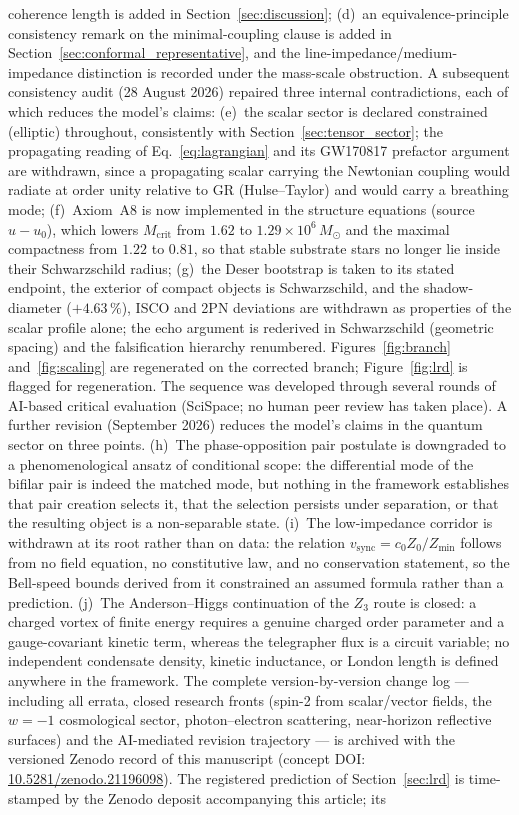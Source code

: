 \documentclass[11pt,a4paper]{article}
\theoremstyle{plain}
\theoremstyle{remark}
\begin{document}
coherence length is added in Section~\ref{sec:discussion}; (d)~an equivalence-principle consistency remark on the minimal-coupling clause is added in Section~\ref{sec:conformal_representative}, and the line-impedance/medium-impedance distinction is recorded under the mass-scale obstruction. A subsequent consistency audit (28 August 2026) repaired three internal contradictions, each of which reduces the model's claims: (e)~the scalar sector is declared constrained (elliptic) throughout, consistently with Section~\ref{sec:tensor_sector}; the propagating reading of Eq.~\eqref{eq:lagrangian} and its GW170817 prefactor argument are withdrawn, since a propagating scalar carrying the Newtonian coupling would radiate at order unity relative to GR (Hulse--Taylor) and would carry a breathing mode; (f)~Axiom~A8 is now implemented in the structure equations (source $u - u_0$), which lowers $M_{\text{crit}}$ from $1.62$ to $1.29\times10^{6}\,M_\odot$ and the maximal compactness from $1.22$ to $0.81$, so that stable substrate stars no longer lie inside their Schwarzschild radius; (g)~the Deser bootstrap is taken to its stated endpoint, the exterior of compact objects is Schwarzschild, and the shadow-diameter ($+4.63\,\%$), ISCO and 2PN deviations are withdrawn as properties of the scalar profile alone; the echo argument is rederived in Schwarzschild (geometric spacing) and the falsification hierarchy renumbered. Figures~\ref{fig:branch} and~\ref{fig:scaling} are regenerated on the corrected branch; Figure~\ref{fig:lrd} is flagged for regeneration. The sequence was developed through several rounds of AI-based critical evaluation (SciSpace; no human peer review has taken place). A further revision (September 2026) reduces the model's claims in the quantum sector on three points. (h)~The phase-opposition pair postulate is downgraded to a phenomenological ansatz of conditional scope: the differential mode of the bifilar pair is indeed the matched mode, but nothing in the framework establishes that pair creation selects it, that the selection persists under separation, or that the resulting object is a non-separable state. (i)~The low-impedance corridor is withdrawn at its root rather than on data: the relation $v_{\text{sync}} = c_0 Z_0/Z_{\min}$ follows from no field equation, no constitutive law, and no conservation statement, so the Bell-speed bounds derived from it constrained an assumed formula rather than a prediction. (j)~The Anderson--Higgs continuation of the $Z_3$ route is closed: a charged vortex of finite energy requires a genuine charged order parameter and a gauge-covariant kinetic term, whereas the telegrapher flux is a circuit variable; no independent condensate density, kinetic inductance, or London length is defined anywhere in the framework. The complete version-by-version change log --- including all errata, closed research fronts (spin-2 from scalar/vector fields, the $w=-1$ cosmological sector, photon--electron scattering, near-horizon reflective surfaces) and the AI-mediated revision trajectory --- is archived with the versioned Zenodo record of this manuscript (concept DOI: \href{https://doi.org/10.5281/zenodo.21196098}{10.5281/zenodo.21196098}). The registered prediction of Section~\ref{sec:lrd} is time-stamped by the Zenodo deposit accompanying this article; its 
\end{document}
